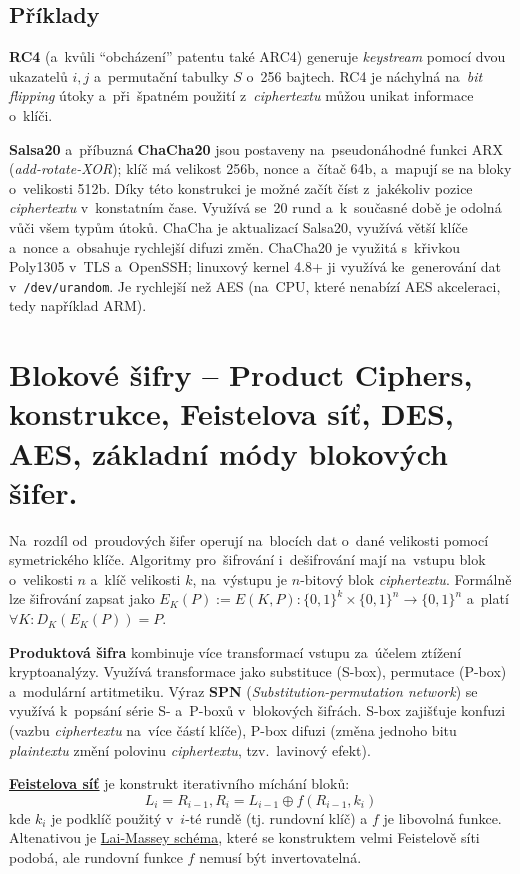 \subsection{Příklady}

\textbf{RC4} (a~kvůli \enquote{obcházení} patentu také ARC4) generuje \emph{keystream} pomocí dvou ukazatelů $i, j$ a~permutační tabulky $S$ o~256 bajtech. RC4 je náchylná na~\emph{bit flipping} útoky a~při~špatném použití z~\emph{ciphertextu} můžou unikat informace o~klíči.

\textbf{Salsa20} a~příbuzná \textbf{ChaCha20} jsou postaveny na~pseudonáhodné funkci ARX (\emph{add-rotate-XOR}); klíč má velikost 256b, nonce a~čítač 64b, a~mapují se na bloky o~velikosti 512b. Díky této konstrukci je možné začít číst z~jakékoliv pozice \emph{ciphertextu} v~konstatním čase. Využívá se~20 rund a~k~současné době je odolná vůči všem typům útoků. ChaCha je aktualizací Salsa20, využívá větší klíče a~nonce a~obsahuje rychlejší difuzi změn. ChaCha20 je využitá s~křivkou Poly1305 v~TLS a~OpenSSH; linuxový kernel 4.8+ ji využívá ke~generování dat v~\texttt{/dev/urandom}. Je rychlejší než AES (na~CPU, které nenabízí AES akceleraci, tedy například ARM).

\clearpage
\section{Blokové šifry -- Product Ciphers, konstrukce, Feistelova síť, DES, AES, základní módy blokových šifer.}

Na~rozdíl od~proudových šifer operují na~blocích dat o~dané velikosti pomocí symetrického klíče. Algoritmy pro~šifrování i~dešifrování mají na~vstupu blok o~velikosti $n$ a~klíč velikosti $k$, na~výstupu je $n$-bitový blok \emph{ciphertextu}. Formálně lze šifrování zapsat jako $E_K (P) := E(K, P): \{0, 1\}^k \times \{0, 1\}^n \rightarrow \{0, 1\}^n$ a~platí $\forall K: D_K (E_K (P)) = P$.

\textbf{Produktová šifra} kombinuje více transformací vstupu za~účelem ztížení kryptoanalýzy. Využívá transformace jako substituce (S-box), permutace (P-box) a~modulární artitmetiku. Výraz \textbf{SPN} (\emph{Substitution-permutation network}) se využívá k~popsání série S- a~P-boxů v~blokových šifrách. S-box zajišťuje konfuzi (vazbu \emph{ciphertextu} na~více částí klíče), P-box difuzi (změna jednoho bitu \emph{plaintextu} změní polovinu \emph{ciphertextu}, tzv.~lavinový efekt).

\textbf{\href{https://en.wikipedia.org/wiki/Feistel_network}{Feistelova síť}} je konstrukt iterativního míchání bloků: $$L_i = R_{i-1}, R_i = L_{i-1} \oplus f(R_{i-1}, k_i)$$ kde $k_i$ je podklíč použitý v~$i$-té rundě (tj. rundovní klíč) a $f$ je libovolná funkce. Altenativou je \href{https://en.wikipedia.org/wiki/Lai-Massey_scheme}{Lai-Massey schéma}, které se konstruktem velmi Feistelově síti podobá, ale rundovní funkce $f$ nemusí být invertovatelná.

